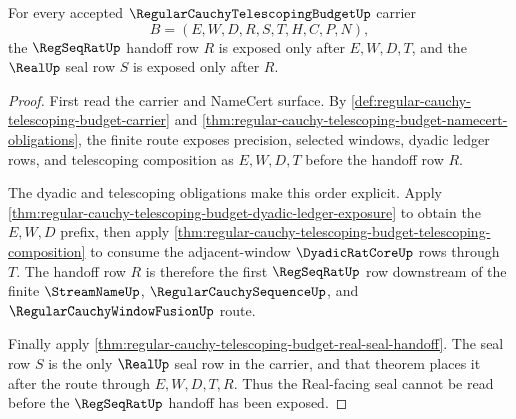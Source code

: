 \begin{theorem}
\label{thm:regular-cauchy-telescoping-budget-regseqrat-handoff-order}
For every accepted $\RegularCauchyTelescopingBudgetUp$ carrier
$$
B=(E,W,D,R,S,T,H,C,P,N),
$$
the $\RegSeqRatUp$ handoff row $R$ is exposed only after $E,W,D,T$, and the $\RealUp$ seal row $S$ is exposed only after $R$.
\end{theorem}
\begin{proof}
First read the carrier and NameCert surface. By \autoref{def:regular-cauchy-telescoping-budget-carrier} and \autoref{thm:regular-cauchy-telescoping-budget-namecert-obligations}, the finite route exposes precision, selected windows, dyadic ledger rows, and telescoping composition as $E,W,D,T$ before the handoff row $R$.

The dyadic and telescoping obligations make this order explicit. Apply \autoref{thm:regular-cauchy-telescoping-budget-dyadic-ledger-exposure} to obtain the $E,W,D$ prefix, then apply \autoref{thm:regular-cauchy-telescoping-budget-telescoping-composition} to consume the adjacent-window $\DyadicRatCoreUp$ rows through $T$. The handoff row $R$ is therefore the first $\RegSeqRatUp$ row downstream of the finite $\StreamNameUp$, $\RegularCauchySequenceUp$, and $\RegularCauchyWindowFusionUp$ route.

Finally apply \autoref{thm:regular-cauchy-telescoping-budget-real-seal-handoff}. The seal row $S$ is the only $\RealUp$ seal row in the carrier, and that theorem places it after the route through $E,W,D,T,R$. Thus the Real-facing seal cannot be read before the $\RegSeqRatUp$ handoff has been exposed.
\end{proof}

